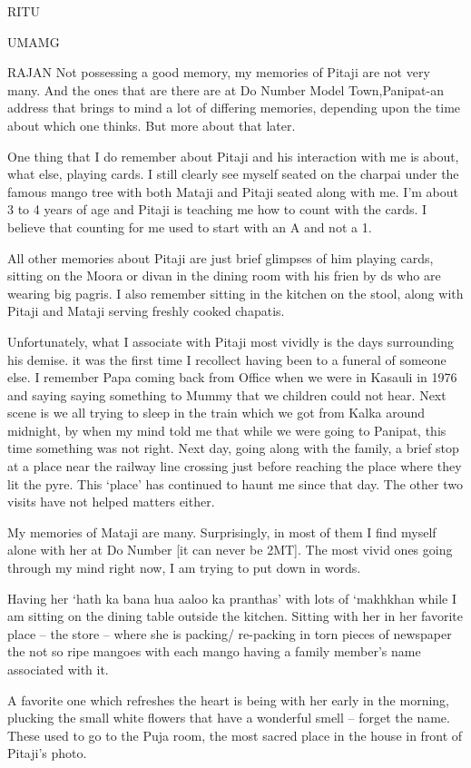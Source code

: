 RITU

UMAMG

RAJAN
Not possessing a good memory, my memories of Pitaji are not very many. And the ones that are there are at Do Number Model Town,Panipat-an address that brings to mind a lot of differing memories, depending upon the time about which one thinks. But more about that later.

One thing that I do remember about Pitaji and his interaction with me is about, what else, playing cards. I still clearly see myself seated on the charpai under the famous mango tree with both Mataji and Pitaji seated along with me. I’m about 3 to 4 years of age and Pitaji is teaching me how to count with the cards. I believe that counting for me used to start with an A and not a 1.

All other memories about Pitaji are just brief glimpses of him playing cards, sitting on the Moora or divan in the dining room with his frien by ds who are wearing big pagris. I also remember sitting in the kitchen on the stool, along with Pitaji and Mataji serving freshly cooked chapatis.

Unfortunately, what I associate with Pitaji most vividly is the days surrounding his demise. it was the first time I recollect having been to a funeral of someone else. I remember Papa coming back from Office when we were in Kasauli in 1976 and saying saying something to Mummy that we children could not hear. Next scene is we all trying to sleep in the train which we got from Kalka around midnight, by when my mind told me that while we were going to Panipat, this time something was not right. Next day, going along with the family, a brief stop at a place near the railway line crossing just before reaching the place where they lit the pyre. This ‘place’ has continued to haunt me since that day. The other two visits have not helped matters either.

My memories of Mataji are many. Surprisingly, in most of them I find myself alone with her at Do Number [it can never be 2MT]. The most vivid ones going through my mind right now, I am trying to put down in words.

Having her ‘hath ka bana hua aaloo ka pranthas’ with lots of ‘makhkhan while I am sitting on the dining table outside the kitchen. Sitting with her in her favorite place – the store – where she is packing/ re-packing in torn pieces of newspaper the not so ripe mangoes with each mango having a family member’s name associated with it.

A favorite one which refreshes the heart is being with her early in the morning, plucking the small white flowers that have a wonderful smell – forget the name. These used to go to the Puja room, the most sacred place in the house in front of Pitaji’s photo.

